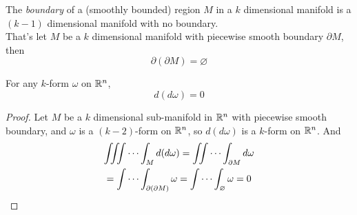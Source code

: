 \documentclass[11pt]{article}
\begin{document}
			\begin{theorem}
				The \emph{boundary} of a (smoothly bounded) region $M$ in a $k$ dimensional manifold is a $(k-1)$ dimensional manifold with no boundary. \\
				That's let $M$ be a $k$ dimensional manifold with piecewise smooth boundary $\partial M$, then
				\begin{equation}
					\partial (\partial M) = \varnothing
				\end{equation}
			\end{theorem}
			
			\begin{theorem}
				For any $k$-form $\omega$ on $\mathbb{R}^n$,
				\begin{equation}
					d(d\omega) = 0
				\end{equation}
				
				\begin{proof}
					Let $M$ be a $k$ dimensional sub-manifold in $\mathbb{R}^n$ with piecewise smooth boundary, and $\omega$ is a $(k-2)$-form on $\mathbb{R}^n$, so $d(d\omega)$ is a $k$-form on $\mathbb{R}^n$. And
					\begin{gather}
						\iiint \cdots \int_M d(d \omega) 
						= \iint \cdots \int_{\partial M} d\omega \\
						= \idotsint_{\partial(\partial M)} \omega = \idotsint_{\varnothing} \omega = 0
					\end{gather}
				\end{proof}
			\end{theorem}
\end{document}
